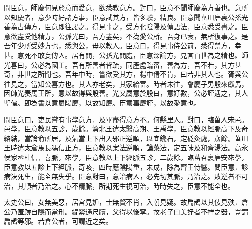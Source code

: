 問臣意，師慶何見於意而愛意，欲悉教意方。對曰，臣意不聞師慶為方善也。意所以知慶者，意少時好諸方事，臣意試其方，皆多驗，精良。臣意聞菑川唐裏公孫光善為古傳方，臣意即往謁之。得見事之，受方化陰陽及傳語法，臣意悉受書之。臣意欲盡受他精方，公孫光曰，吾方盡矣，不為愛公所。吾身已衰，無所復事之。是吾年少所受妙方也，悉與公，毋以教人。臣意曰，得見事侍公前，悉得禁方，幸甚。意死不敢妄傳人。居有閒，公孫光閒處，臣意深論方，見言百世為之精也。師光喜曰，公必為國工。吾有所善者皆疏，同產處臨菑，善為方，吾不若，其方甚奇，非世之所聞也。吾年中時，嘗欲受其方，楊中倩不肯，曰若非其人也。胥與公往見之，當知公喜方也。其人亦老矣，其家給富。時者未往，會慶子男殷來獻馬，因師光奏馬王所，意以故得與殷善。光又屬意於殷曰，意好數，公必謹遇之，其人聖儒。即為書以意屬陽慶，以故知慶。臣意事慶謹，以故愛意也。

問臣意曰，吏民嘗有事學意方，及畢盡得意方不。何縣里人。對曰，臨菑人宋邑。邑學，臣意教以五診，歲餘。濟北王遣太醫高期、王禹學，臣意教以經脈高下及奇絡結，當論俞所居，及氣當上下出入邪正逆順，以宜鑱石，定砭灸處，歲餘。菑川王時遣太倉馬長馮信正方，臣意教以案法逆順，論藥法，定五味及和齊湯法。高永侯家丞杜信，喜脈，來學，臣意教以上下經脈五診，二歲餘。臨菑召裏唐安來學，臣意教以五診上下經脈，奇咳，四時應陰陽重，未成，除為齊王侍醫。問臣意，診病決死生，能全無失乎。臣意對曰，意治病人，必先切其脈，乃治之。敗逆者不可治，其順者乃治之。心不精脈，所期死生視可治，時時失之，臣意不能全也。

太史公曰，女無美惡，居宮見妒，士無賢不肖，入朝見疑。故扁鵲以其伎見殃，倉公乃匿跡自隱而當刑。緹縈通尺牘，父得以後寧。故老子曰美好者不祥之器，豈謂扁鵲等邪。若倉公者，可謂近之矣。